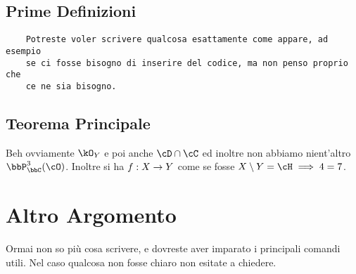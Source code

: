 \subsection{Prime Definizioni}
\begin{Verbatim}
    Potreste voler scrivere qualcosa esattamente come appare, ad esempio
    se ci fosse bisogno di inserire del codice, ma non penso proprio che
    ce ne sia bisogno.
\end{Verbatim}

\subsection{Teorema Principale}
Beh ovviamente $\kO_{Y}$ e poi anche $\cD \cap \cC$ ed inoltre non
abbiamo nient'altro $\bbP_\bbC^3 (\cO)$. Inoltre si ha $f: X \rightarrow Y$
come se fosse $X \setminus Y = \cH \implies 4 = 7$.

\section{Altro Argomento}
Ormai non so più cosa scrivere, e dovreste aver imparato i principali comandi
utili. Nel caso qualcosa non fosse chiaro non esitate a chiedere.

